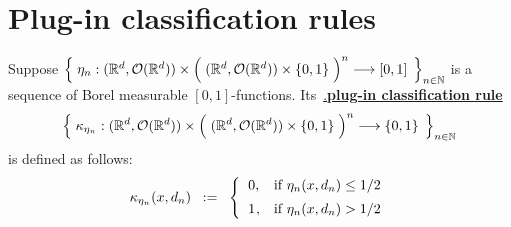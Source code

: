 

\section{Plug-in classification rules}
\setcounter{theorem}{0}
\setcounter{equation}{0}


\renewcommand{\theenumi}{\roman{enumi}}
\renewcommand{\labelenumi}{\textnormal{(\theenumi)}$\;\;$}


\begin{definition}
\mbox{}\vskip 0.1cm
\noindent
Suppose
\;$\left\{\;
\eta_{n} :
(\Re^{d},\mathcal{O}(\Re^{d})) \times \left(\;(\Re^{d},\mathcal{O}(\Re^{d})) \overset{{\color{white}.}}{\times} \{0,1\} \;\right)^{n}
\longrightarrow
[0,1]
\,\;\right\}_{n \in \N}$\;
is a sequence of Borel measurable $[0,1]$-functions.
Its \,\underline{{\color{white}.}\textbf{plug-in classification rule}}
\begin{equation*}
\left\{\;
\kappa_{\eta_{n}} : 
(\Re^{d},\mathcal{O}(\Re^{d})) \times \left(\;(\Re^{d},\mathcal{O}(\Re^{d})) \overset{{\color{white}.}}{\times} \{0,1\} \;\right)^{n}
\longrightarrow
\{0,1\}
\,\;\right\}_{n\in\N}
\end{equation*}
is defined as follows:
\begin{equation*}
\kappa_{\eta_{n}}(x,d_{n})
\;\; := \;\;
	\left\{\begin{array}{cl}
	0, & \textnormal{if $\eta_{n}(x,d_{n}) \leq 1/2$}
	\\
	\overset{{\color{white}-}}{1}, & \textnormal{if $\eta_{n}(x,d_{n}) > 1/2$}
	\end{array}\right.
\end{equation*}
\end{definition}


